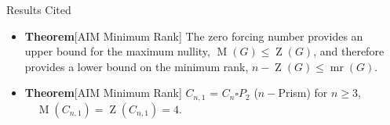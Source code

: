 \documentclass[final]{beamer}
\newcommand{\mr}{\operatorname{mr}}
\newcommand{\M}{\operatorname{M}}
\newcommand{\Z}{\operatorname{Z}}
\newcommand{\A}{\mathcal{A}}
\newcommand{\B}{\mathcal{B}}
\newcommand{\x}{\times}
\newcommand{\bit}{\begin{itemize}}
\newcommand{\eit}{\end{itemize}}
\newcommand{\ben}{\begin{enumerate}}
\newcommand{\een}{\end{enumerate}}
\def\mtx#1{\begin{bmatrix} #1 \end{bmatrix}}
\begin{document}
\begin{frame}{}
\begin{columns}[t]
\begin{column}{0.23\linewidth}


\end{column}%

\begin{column}{0.38\linewidth}
 

\begin{block}{Results Cited}
     
\bit

\item {\bf Theorem}[AIM Minimum Rank]
The zero forcing number provides an upper bound for the maximum nullity, $\M(G) \leq \Z(G)$, and therefore provides a lower bound on the minimum rank, $n-\Z(G) \leq \mr(G)$. 
\item {\bf Theorem}[AIM Minimum Rank]
$C_{n,1}$ =  $C_n \square P_2$ ($n-$Prism) for $n \geq 3$, $\quad\M(C_{n,1}) = \Z(C_{n,1}) = 4.$
\eit
\end{block}


\end{column}
\end{columns}
\end{frame}
\end{document}
